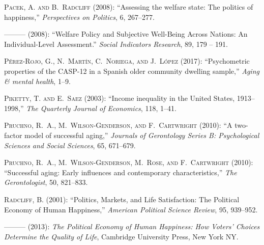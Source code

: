 \textsc{Pacek, A. and B.~Radcliff} (2008{}): \enquote{Assessing the
  welfare state: The politics of happiness,} \emph{Perspectives on Politics},
  6, 267--277.

---\hspace{-.1pt}---\hspace{-.1pt}--- (2008{}): \enquote{Welfare
  Policy and Subjective Well-Being Across Nations: An Individual-Level
  Assessment.} \emph{Social Indicators Research}, 89, 179 -- 191.

\textsc{P{\'e}rez-Rojo, G., N.~Mart{\'\i}n, C.~Noriega, and J.~L{\'o}pez}
  (2017): \enquote{Psychometric properties of the CASP-12 in a Spanish older
  community dwelling sample,} \emph{Aging \& mental health}, 1--9.

\textsc{Piketty, T. and E.~Saez} (2003): \enquote{Income inequality in the
  United States, 1913--1998,} \emph{The Quarterly Journal of Economics}, 118,
  1--41.

\textsc{Pruchno, R.~A., M.~Wilson-Genderson, and F.~Cartwright}
  (2010{}): \enquote{A two-factor model of successful aging,}
  \emph{Journals of Gerontology Series B: Psychological Sciences and Social
  Sciences}, 65, 671--679.

\textsc{Pruchno, R.~A., M.~Wilson-Genderson, M.~Rose, and F.~Cartwright}
  (2010{}): \enquote{Successful aging: Early influences and
  contemporary characteristics,} \emph{The Gerontologist}, 50, 821--833.

\textsc{Radcliff, B.} (2001): \enquote{Politics, Markets, and Life
  Satisfaction: The Political Economy of Human Happiness,} \emph{American
  Political Science Review}, 95, 939--952.

---\hspace{-.1pt}---\hspace{-.1pt}--- (2013): \emph{The Political Economy of
  Human Happiness: How Voters' Choices Determine the Quality of Life},
  Cambridge University Press, New York NY.


